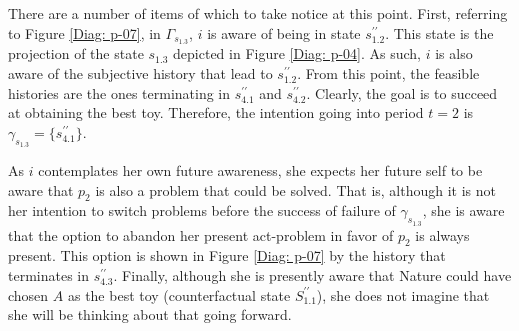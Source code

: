 \documentclass[
11pt,
titlepage,
reqno,
]{article}%
\theoremstyle{definition}
\begin{document}
There are a number of items of which to take notice at this point.
First, referring to Figure \ref{Diag: p-07}, in $\Gamma_{s_{1.3}} $, $i$ is aware of being in state $s^{\prime\prime}_{1.2}$.
This state is the projection of the state  $s_{1.3}$ depicted in Figure \ref{Diag: p-04}.
As such, $i$ is also aware of the subjective history that lead to $s^{\prime\prime}_{1.2}$.
From this point, the feasible histories are the ones terminating in $s^{\prime\prime}_{4.1}$ and $s^{\prime\prime}_{4.2}$.
Clearly, the goal is to succeed at obtaining the best toy.
Therefore, the intention going into period $t=2$ is $\gamma_{s_{1.3}}=\{s^{\prime\prime}_{4.1}\}$.

As $i$ contemplates her own future awareness, she expects her future self to be aware that $p_2$ is also a problem that could be solved.
That is, although it is not her intention to switch problems before the success of failure of $\gamma_{s_{1.3}}$, she is aware that the option to abandon her present act-problem in favor of $p_2$ is always present. 
This option is shown in Figure \ref{Diag: p-07} by the history that terminates in  $s^{\prime\prime}_{4.3}$.
Finally, although she is presently aware that Nature could have chosen $A$ as the best toy (counterfactual state $S^{\prime\prime}_{1.1}$),
she does not imagine that she will be thinking about that going forward. 

\clearpage
\end{document}
